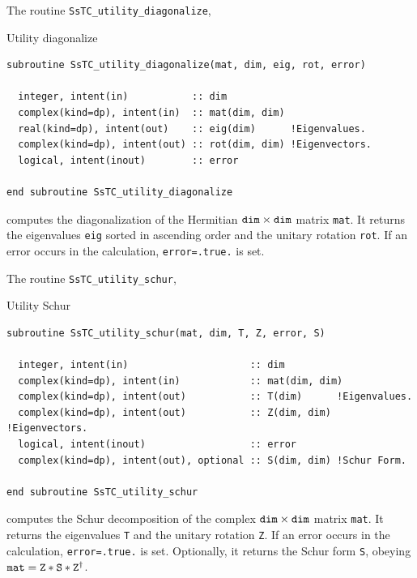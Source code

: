 \documentclass[10pt,a4paper]{article}
\begin{document}
The routine \verb|SsTC_utility_diagonalize|,
\begin{codebox}{Utility diagonalize}
\begin{lstlisting}[caption={Interface of ``utility diagonalize".},captionpos=b]
subroutine SsTC_utility_diagonalize(mat, dim, eig, rot, error)

  integer, intent(in)           :: dim
  complex(kind=dp), intent(in)  :: mat(dim, dim)
  real(kind=dp), intent(out)    :: eig(dim)      !Eigenvalues.
  complex(kind=dp), intent(out) :: rot(dim, dim) !Eigenvectors.
  logical, intent(inout)        :: error

end subroutine SsTC_utility_diagonalize
\end{lstlisting}
\end{codebox}
computes the diagonalization of the Hermitian $\verb|dim|\times\verb|dim|$ matrix \verb|mat|. It returns the eigenvalues \verb|eig| sorted in ascending order and the unitary rotation \verb|rot|. If an error occurs in the calculation, \verb|error=.true.| is set.

The routine \verb|SsTC_utility_schur|,
\begin{codebox}{Utility Schur}
\begin{lstlisting}[caption={Interface of ``utility Schur".},captionpos=b]
subroutine SsTC_utility_schur(mat, dim, T, Z, error, S)

  integer, intent(in)                     :: dim
  complex(kind=dp), intent(in)            :: mat(dim, dim)
  complex(kind=dp), intent(out)           :: T(dim)      !Eigenvalues.
  complex(kind=dp), intent(out)           :: Z(dim, dim) !Eigenvectors.
  logical, intent(inout)                  :: error
  complex(kind=dp), intent(out), optional :: S(dim, dim) !Schur Form.

end subroutine SsTC_utility_schur
\end{lstlisting}
\end{codebox}
computes the Schur decomposition of the complex $\verb|dim|\times\verb|dim|$ matrix \verb|mat|. It returns the eigenvalues \verb|T| and the unitary rotation \verb|Z|. If an error occurs in the calculation, \verb|error=.true.| is set. Optionally, it returns the Schur form \verb|S|, obeying $\verb|mat|= \verb|Z|*\verb|S|*\verb|Z|^{\dagger}$.
\end{document}
